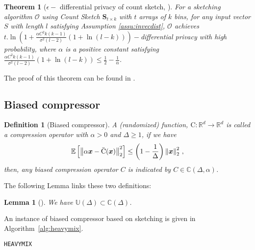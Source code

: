 \documentclass{article}
\newtheorem{theorem}{Theorem}
\newtheorem{definition}{Definition}
\newtheorem{lemma}{Lemma}
\begin{document}
\begin{theorem}[$\epsilon-$ differential privacy of count sketch, \cite{li2019privacy}]
For a sketching algorithm $\mathcal{O}$ using Count Sketch $\mathbf{S}_{t\times k}$ with $t$ arrays of $k$ bins, for any input vector $S$ with length $l$ satisfying Assumption \ref{assu:invecdist}, $\mathcal{O}$ achieves $t.\ln \left(1+\frac{\alpha C^2 k(k-1)}{\sigma^2(l-2)}(1+\ln(l-k) )\right)-$differential privacy with high probability, where $\alpha$ is a positive constant satisfying $\frac{\alpha C^2 k(k-1)}{\sigma^2(l-2)}(1+\ln(l-k) )\leq \frac{1}{2}-\frac{1}{\alpha}$.
\end{theorem}
The proof of this theorem can be found in \cite{li2019privacy}.




\subsection{Biased compressor}
\begin{definition}[Biased compressor]
A (randomized) function,  ${\text{C}}:\mathbb{R}^{d}\rightarrow\mathbb{R}^{d}$ is called a compression operator with $\alpha>0$ and $\Delta\geq 1$, if we have 
\begin{align}\notag
    \mathbb{E}\left[\left\|\alpha\boldsymbol{x}-\bar{\text{C}}(\boldsymbol{x})\right\|^2_2\right]\leq \left(1-\frac{1}{\Delta}\right)\left\|\boldsymbol{x}\right\|^2_2\, ,
\end{align}
then, any biased compression operator $C$ is indicated by $C\in \mathbb{C}(\Delta,\alpha)$. 
\end{definition}
The following Lemma links these two definitions:
\begin{lemma}[\cite{horvath2020better}]
We have $\mathbb{U}(\Delta)\subset\mathbb{C}(\Delta)$.
\end{lemma}

An instance of biased compressor based on sketching is given in Algorithm~\ref{alg:heavymix}.
\begin{algorithm}[H]
\caption{\texttt{HEAVYMIX} \cite{ivkin2019communication} }\label{alg:heavymix}
\begin{algorithmic}[1]
\end{algorithmic}
\end{algorithm}
\end{document}
